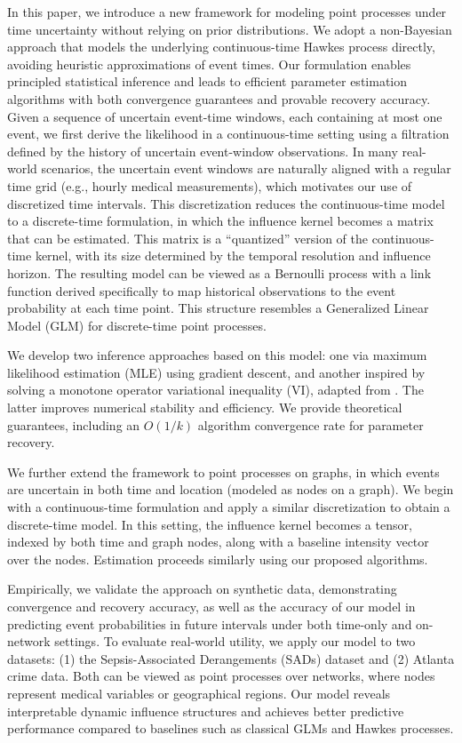 \documentclass[11pt]{article}
\theoremstyle{remark}
\theoremstyle{plain}
\begin{document}
In this paper, we introduce a new framework for modeling point processes under time uncertainty without relying on prior distributions. We adopt a non-Bayesian approach that models the underlying continuous-time Hawkes process directly, avoiding heuristic approximations of event times. Our formulation enables principled statistical inference and leads to efficient parameter estimation algorithms with both convergence guarantees and provable recovery accuracy.
%
Given a sequence of uncertain event-time windows, each containing at most one event, we first derive the likelihood in a continuous-time setting using a filtration defined by the history of uncertain event-window observations. In many real-world scenarios, the uncertain event windows are naturally aligned with a regular time grid (e.g., hourly medical measurements), which motivates our use of discretized time intervals.
%
This discretization reduces the continuous-time model to a discrete-time formulation, in which the influence kernel becomes a matrix that can be estimated. This matrix is a ``quantized'' version of the continuous-time kernel, with its size determined by the temporal resolution and influence horizon. The resulting model can be viewed as a Bernoulli process with a link function derived specifically to map historical observations to the event probability at each time point. This structure resembles a Generalized Linear Model (GLM) for discrete-time point processes.

We develop two inference approaches based on this model: one via maximum likelihood estimation (MLE) using gradient descent, and another inspired by solving a monotone operator variational inequality (VI), adapted from \cite{juditsky2019signal}. The latter improves numerical stability and efficiency. We provide theoretical guarantees, including an $O(1/k)$ algorithm convergence rate for parameter recovery.

We further extend the framework to point processes on graphs, in which events are uncertain in both time and location (modeled as nodes on a graph). We begin with a continuous-time formulation and apply a similar discretization to obtain a discrete-time model. In this setting, the influence kernel becomes a tensor, indexed by both time and graph nodes, along with a baseline intensity vector over the nodes. Estimation proceeds similarly using our proposed algorithms.

Empirically, we validate the approach on synthetic data, demonstrating convergence and recovery accuracy, as well as the accuracy of our model in predicting event probabilities in future intervals under both time-only and on-network settings. To evaluate real-world utility, we apply our model to two datasets: (1) the Sepsis-Associated Derangements (SADs) dataset \cite{physionetChallenge} and (2) Atlanta crime data. Both can be viewed as point processes over networks, where nodes represent medical variables or geographical regions. Our model reveals interpretable dynamic influence structures and achieves better predictive performance compared to baselines such as classical GLMs and Hawkes processes.
\end{document}
